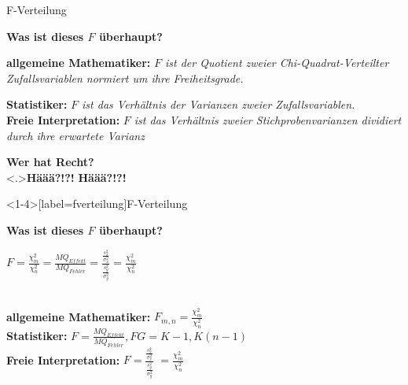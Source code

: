\documentclass{beamer}
\begin{document}
	\begin{frame}{F-Verteilung}
		\begin{center}
			\textbf{Was ist dieses $F$ überhaupt?}
		\end{center}
		\textbf{allgemeine Mathematiker:} \emph{$F$ ist der Quotient zweier Chi-Quadrat-Verteilter Zufallsvariablen normiert um ihre Freiheitsgrade.} \\ \vspace{0.7ex}
		\pause
		
		\textbf{Statistiker:} \emph{$F$ ist das Verhältnis der Varianzen zweier Zufallsvariablen.}\\
		\vspace{0.7ex} \pause
		\textbf{Freie Interpretation:} \emph{$F$ ist das Verhältnis zweier Stichprobenvarianzen dividiert durch ihre erwartete Varianz} \\ \vspace{0.7ex} \pause
		\begin{center}
			\textbf{Wer hat Recht? }
			\\ \vspace{0.7ex} \pause \note<.>{\alert{{\Large \textbf{Häää?!?!}} }}
			\alert{{\Large \textbf{Häää?!?!}} }
		\end{center}
	\end{frame}
	
	\begin{frame}<1-4>[label=fverteilung]{F-Verteilung}
		\begin{center}
			\textbf{Was ist dieses $F$ überhaupt?}
		
		\pause[]$F=\frac{\chi^2_m}{\chi^2_n}$\pause[3] $=\frac{MQ_{Effekt}}{MQ_{Fehler}}$\pause[4] $=\frac{\frac{s_x^2}{\sigma_x^2}}{\frac{s_y^2}{\sigma_y^2}}$\pause[5]  $=\frac{\chi^2_m}{\chi^2_n}$ 
		\end{center}
		\pause[2]~\\ \vspace{1.2ex}
		\textbf{allgemeine Mathematiker:} \emph{$F_{m,n}=\frac{\chi^2_m}{\chi^2_n}$}   
		 \pause[3] ~\\ \vspace{1.2ex}
		\textbf{Statistiker:} $F = \frac{MQ_{Effekt}}{MQ_{Fehler}}, FG=K-1,K(n-1)$ \pause[4] ~\\  \vspace{1.2ex} 
		\textbf{Freie Interpretation:} $F = \frac{\frac{s_x^2}{\sigma_x^2}}{\frac{s_y^2}{\sigma_y^2}}$ \pause[5]  $=\frac{\chi^2_m}{\chi^2_n}$ ~\\
	\end{frame}
	
\end{document}
